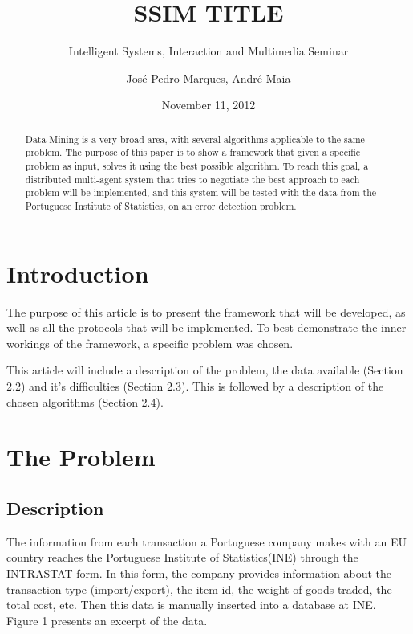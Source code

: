 \documentclass{llncs}
\begin{document}
\title{SSIM TITLE}
\subtitle{Intelligent Systems, Interaction and Multimedia Seminar}
\author{José Pedro Marques, André Maia}
\date{November 11, 2012}
\maketitle


\begin{abstract}
Data Mining is a very broad area, with several algorithms applicable to the same problem. The purpose of this paper is to show a framework that given a specific problem as input, solves it using the best possible algorithm. To reach this goal, a distributed multi-agent system that tries to negotiate the best approach to each problem will be implemented, and this system will be tested with the data from the Portuguese Institute of Statistics, on an error detection problem.
\end{abstract}


\section{Introduction}

The purpose of this article is to present the framework that will be developed, as well as all the protocols that will be implemented. To best demonstrate the inner workings of the framework, a specific problem was chosen.

This article will include a description of the problem, the data available (Section 2.2) and it's difficulties (Section 2.3). This is followed by a description of the chosen algorithms (Section 2.4).

\section{The Problem}

\subsection{Description}

The information from each transaction a Portuguese company makes with an EU country reaches the Portuguese Institute of Statistics(INE) through the INTRASTAT form. In this form, the company provides information  about the transaction type (import/export), the item id, the weight of goods traded, the total cost, etc. Then this data is manually inserted into a database at INE. Figure 1 presents an excerpt of the data.
\end{document}
